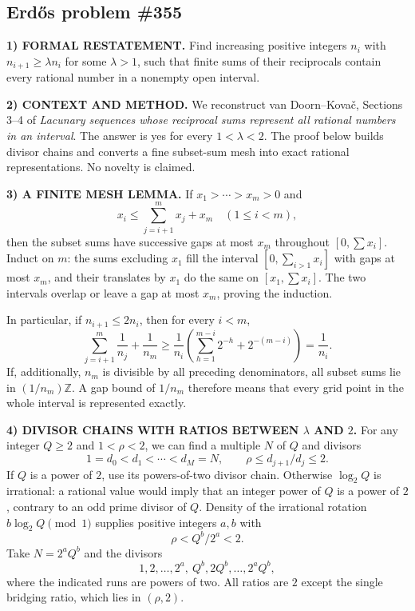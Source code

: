 \subsection*{Erd\H{o}s problem \#355}

\noindent\textbf{1) FORMAL RESTATEMENT.}
Find increasing positive integers $n_i$ with $n_{i+1}\ge\lambda n_i$ for some $\lambda>1$, such that finite sums of their reciprocals contain every rational number in a nonempty open interval.

\noindent\textbf{2) CONTEXT AND METHOD.}
We reconstruct van Doorn--Kova\v{c}, Sections 3--4 of \emph{Lacunary sequences whose reciprocal sums represent all rational numbers in an interval}. The answer is yes for every $1<\lambda<2$. The proof below builds divisor chains and converts a fine subset-sum mesh into exact rational representations. No novelty is claimed.

\noindent\textbf{3) A FINITE MESH LEMMA.}
If $x_1>\cdots>x_m>0$ and
\[
 x_i\le\sum_{j=i+1}^m x_j+x_m\quad(1\le i<m),
\]
then the subset sums have successive gaps at most $x_m$ throughout $[0,\sum x_i]$. Induct on $m$: the sums excluding $x_1$ fill the interval $[0,\sum_{i>1}x_i]$ with gaps at most $x_m$, and their translates by $x_1$ do the same on $[x_1,\sum x_i]$. The two intervals overlap or leave a gap at most $x_m$, proving the induction.

In particular, if $n_{i+1}\le2n_i$, then for every $i<m$,
\[
 \sum_{j=i+1}^m\frac1{n_j}+\frac1{n_m}
 \ge\frac1{n_i}\left(\sum_{h=1}^{m-i}2^{-h}+2^{-(m-i)}\right)=\frac1{n_i}.
\]
If, additionally, $n_m$ is divisible by all preceding denominators, all subset sums lie in $(1/n_m)\mathbb Z$. A gap bound of $1/n_m$ therefore means that every grid point in the whole interval is represented exactly.

\noindent\textbf{4) DIVISOR CHAINS WITH RATIOS BETWEEN $\lambda$ AND $2$.}
For any integer $Q\ge2$ and $1<\rho<2$, we can find a multiple $N$ of $Q$ and divisors
\[
 1=d_0<d_1<\cdots<d_M=N,
 \qquad \rho\le d_{j+1}/d_j\le2.
\]
If $Q$ is a power of $2$, use its powers-of-two divisor chain. Otherwise $\log_2Q$ is irrational: a rational value would imply that an integer power of $Q$ is a power of $2$, contrary to an odd prime divisor of $Q$. Density of the irrational rotation $b\log_2Q\pmod1$ supplies positive integers $a,b$ with
\[
 \rho<Q^b/2^a<2.
\]
Take $N=2^aQ^b$ and the divisors
\[
 1,2,\ldots,2^a,\ Q^b,2Q^b,\ldots,2^aQ^b,
\]
where the indicated runs are powers of two. All ratios are $2$ except the single bridging ratio, which lies in $(\rho,2)$.

